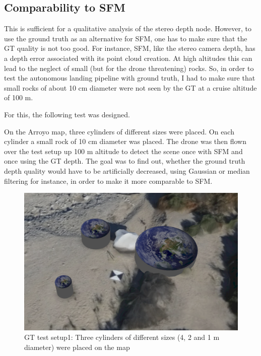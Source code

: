 \subsection{Comparability to SFM}

This is sufficient for a qualitative analysis of the stereo depth node. However, to use the ground truth as an alternative for SFM, one has to make sure that the GT quality is not too good. For instance, SFM, like the stereo camera depth, has a depth error associated with its point cloud creation. At high altitudes this can lead to the neglect of small (but for the drone threatening) rocks. So, in order to test the autonomous landing pipeline with ground truth, I had to make sure that small rocks of about 10 cm diameter were not seen by the GT at a cruise altitude of 100 m.

For this, the following test was designed.

On the Arroyo map, three cylinders of different sizes were placed. On each cylinder a small rock of 10 cm diameter was placed. The drone was then flown over the test setup up 100 m altitude to detect the scene once with SFM and once using the GT depth. The goal was to find out, whether the ground truth depth quality would have to be artificially decreased, using Gaussian or median filtering for instance, in order to make it more comparable to SFM.

\begin{figure}[ht]
\centering
\includegraphics[scale=0.3]{images/methodology/test_setup1.png}
\caption{GT test setup1: Three cylinders of different sizes (4, 2 and 1 m diameter) were placed on the map}
\label{fig:gt_test_setup1}
\end{figure}

